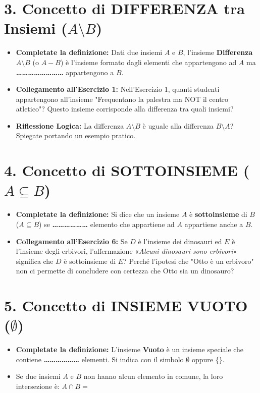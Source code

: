 \documentclass[11pt, a4paper]{article}
\begin{document}
\section*{3. Concetto di DIFFERENZA tra Insiemi ($A \setminus B$)}
\begin{itemize}
    \item \textbf{Completate la definizione:} Dati due insiemi $A$ e $B$, l'insieme \textbf{Differenza} $A \setminus B$ (o $A - B$) è l'insieme formato dagli elementi che appartengono ad $A$ ma \textbf{\dots\dots\dots\dots\dots\dots\dots\dots} appartengono a $B$.
    \item \textbf{Collegamento all'Esercizio 1:} Nell'Esercizio 1, quanti studenti appartengono all'insieme "Frequentano la palestra ma NOT il centro atletico"? Questo insieme corrisponde alla differenza tra quali insiemi? \dotfill
    \item \textbf{Riflessione Logica:} La differenza $A \setminus B$ è uguale alla differenza $B \setminus A$? Spiegate portando un esempio pratico.
    
    \vspace{0.8cm}
\end{itemize}

\vspace{-1mm}

\section*{4. Concetto di SOTTOINSIEME ($A \subseteq B$)}
\begin{itemize}
    \item \textbf{Completate la definizione:} Si dice che un insieme $A$ è \textbf{sottoinsieme} di $B$ ($A \subseteq B$) se \textbf{\dots\dots\dots\dots\dots\dots} elemento che appartiene ad $A$ appartiene anche a $B$.
    \item \textbf{Collegamento all'Esercizio 6:} Se $D$ è l'insieme dei dinosauri ed $E$ è l'insieme degli erbivori, l'affermazione «\textit{Alcuni dinosauri sono erbivori}» significa che $D$ è sottoinsieme di $E$? Perché l'ipotesi che "Otto è un erbivoro" non ci permette di concludere con certezza che Otto sia un dinosauro?
    
    \vspace{0.8cm}
\end{itemize}

\vspace{-1mm}

\section*{5. Concetto di INSIEME VUOTO ($\emptyset$)}
\begin{itemize}
    \item \textbf{Completate la definizione:} L'insieme \textbf{Vuoto} è un insieme speciale che contiene \textbf{\dots\dots\dots\dots\dots\dots} elementi. Si indica con il simbolo $\emptyset$ oppure $\{ \}$.
    \item Se due insiemi $A$ e $B$ non hanno alcun elemento in comune, la loro intersezione è: $A \cap B = $ \dotfill
\end{itemize}
\end{document}
